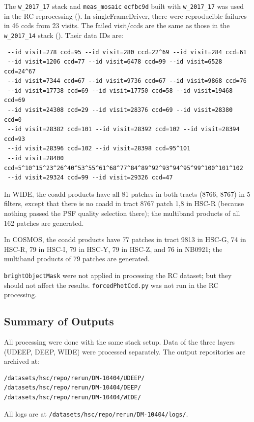 \documentclass[DM,authoryear,toc]{lsstdoc}
\begin{document}
The \texttt{w{\_}2017{\_}17} stack and \texttt{meas{\_}mosaic} \texttt{ecfbc9d} built with \texttt{w{\_}2017{\_}17} was used in the RC reprocessing ().
In singleFrameDriver, there were reproducible failures in 46 ccds from 23 visits. The failed visit/ccds are the same as those in the \texttt{w{\_}2017{\_}14} stack (). Their data IDs are:
\begin{verbatim}
 --id visit=278 ccd=95 --id visit=280 ccd=22^69 --id visit=284 ccd=61
 --id visit=1206 ccd=77 --id visit=6478 ccd=99 --id visit=6528 ccd=24^67
 --id visit=7344 ccd=67 --id visit=9736 ccd=67 --id visit=9868 ccd=76
 --id visit=17738 ccd=69 --id visit=17750 ccd=58 --id visit=19468 ccd=69
 --id visit=24308 ccd=29 --id visit=28376 ccd=69 --id visit=28380 ccd=0
 --id visit=28382 ccd=101 --id visit=28392 ccd=102 --id visit=28394 ccd=93
 --id visit=28396 ccd=102 --id visit=28398 ccd=95^101
 --id visit=28400 ccd=5^10^15^23^26^40^53^55^61^68^77^84^89^92^93^94^95^99^100^101^102
 --id visit=29324 ccd=99 --id visit=29326 ccd=47
\end{verbatim}

In WIDE, the coadd products have all 81 patches in both tracts (8766, 8767) in 5 filters, except that there is no coadd in tract 8767 patch 1,8 in HSC-R (because nothing passed the PSF quality selection there); the multiband products of all 162 patches are generated.

In COSMOS, the coadd products have 77 patches in tract 9813 in HSC-G, 74 in HSC-R, 79 in HSC-I, 79 in HSC-Y, 79 in HSC-Z, and 76 in NB0921; the multiband products of 79 patches are generated.

\texttt{brightObjectMask} were not applied in processing the RC dataset; but they should not affect the results. \texttt{forcedPhotCcd.py} was not run in the RC processing.

\subsection{Summary of Outputs} \label{summaryOutputs}
All processing were done with the same stack setup. Data of the three layers (UDEEP, DEEP, WIDE) were processed separately.
The output repositories are archived at:
\begin{verbatim}
/datasets/hsc/repo/rerun/DM-10404/UDEEP/
/datasets/hsc/repo/rerun/DM-10404/DEEP/
/datasets/hsc/repo/rerun/DM-10404/WIDE/
\end{verbatim}
All logs are at \texttt{/datasets/hsc/repo/rerun/DM-10404/logs/}.
\end{document}
